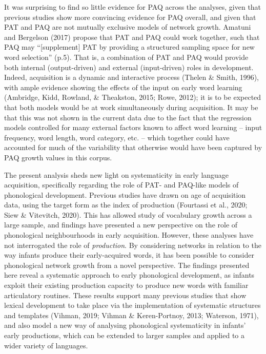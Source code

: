 \documentclass[
  man]{apa6}
\begin{document}
It was surprising to find so little evidence for PAQ across the analyses, given that previous studies show more convincing evidence for PAQ overall, and given that PAT and PAQ are not mutually exclusive models of network growth. Amatuni and Bergelson (2017) propose that PAT and PAQ could work together, such that PAQ may ``{[}supplement{]} PAT by providing a structured sampling space for new word selection'' (p.5). That is, a combination of PAT and PAQ would provide both internal (output-driven) and external (input-driven) roles in development. Indeed, acquisition is a dynamic and interactive process (Thelen \& Smith, 1996), with ample evidence showing the effects of the input on early word learning (Ambridge, Kidd, Rowland, \& Theakston, 2015; Rowe, 2012); it is to be expected that both models would be at work simultaneously during acquisition. It may be that this was not shown in the current data due to the fact that the regression models controlled for many external factors known to affect word learning -- input frequency, word length, word category, etc. -- which together could have accounted for much of the variability that otherwise would have been captured by PAQ growth values in this corpus.

The present analysis sheds new light on systematicity in early language acquisition, specifically regarding the role of PAT- and PAQ-like models of phonological development. Previous studies have drawn on age of acquisition data, using the target form as the index of production (Fourtassi et al., 2020; Siew \& Vitevitch, 2020). This has allowed study of vocabulary growth across a large sample, and findings have presented a new perspective on the role of phonological neighbourhoods in early acquisition. However, these analyses have not interrogated the role of \emph{production}. By considering networks in relation to the way infants produce their early-acquired words, it has been possible to consider phonological network growth from a novel perspective. The findings presented here reveal a systematic approach to early phonological development, as infants exploit their existing production capacity to produce new words with familiar articulatory routines. These results support many previous studies that show lexical development to take place via the implementation of systematic structures and templates (Vihman, 2019; Vihman \& Keren-Portnoy, 2013; Waterson, 1971), and also model a new way of analysing phonological systematicity in infants' early productions, which can be extended to larger samples and applied to a wider variety of languages.
\end{document}

